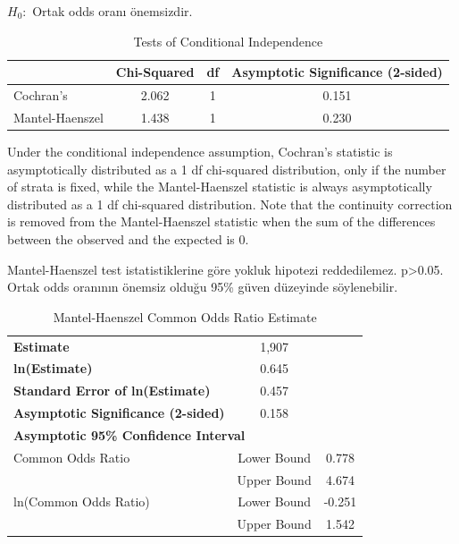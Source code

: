 \documentclass{article}
\begin{document}
\begin{center}
    $H_0:$ Ortak odds oranı önemsizdir.  
\end{center}

\begin{table}[htbp]
\centering
\caption{Tests of Conditional Independence}
\label{tab:conditional-independence-tests}
\begin{tabular}{lccc}
\hline
 & \textbf{Chi-Squared} & \textbf{df} & \textbf{Asymptotic Significance (2-sided)} \\
\hline
Cochran's & 2.062 & 1 & 0.151 \\
Mantel-Haenszel & 1.438 & 1 & 0.230 \\
\hline
\end{tabular}
\end{table}

Under the conditional independence assumption, Cochran's statistic is asymptotically distributed as a 1 df chi-squared distribution, only if the number of strata is fixed, while the Mantel-Haenszel statistic is always asymptotically distributed as a 1 df chi-squared distribution. Note that the continuity correction is removed from the Mantel-Haenszel statistic when the sum of the differences between the observed and the expected is 0.

\vspace{20pt}
Mantel-Haenszel test istatistiklerine göre yokluk hipotezi reddedilemez. p>0.05. Ortak odds oranının önemsiz olduğu 95\% güven düzeyinde söylenebilir. 

\vspace{20pt}
\begin{table}[htbp]
\centering
\caption{Mantel-Haenszel Common Odds Ratio Estimate}
\label{tab:mantel-haenszel-estimate}
\begin{tabular}{lcc}
\hline
\textbf{Estimate} & 1,907 \\
\textbf{ln(Estimate)} & 0.645 \\
\textbf{Standard Error of ln(Estimate)} & 0.457 \\
\textbf{Asymptotic Significance (2-sided)} & 0.158 \\
\hline
\multicolumn{3}{l}{\textbf{Asymptotic 95\% Confidence Interval}} \\
Common Odds Ratio & Lower Bound & 0.778 \\
 & Upper Bound & 4.674 \\
ln(Common Odds Ratio) & Lower Bound & -0.251 \\
 & Upper Bound & 1.542 \\
\hline
\end{tabular}
\end{table}
\end{document}

